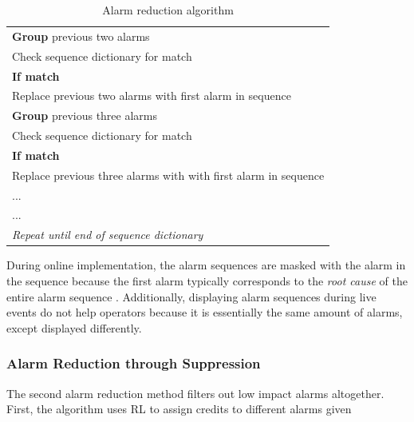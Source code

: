 \begin{table}[H]
{\begin{tabular}{p{14cm}}
	\hspace{1cm} \textbf{Group} previous two alarms \\
	\hspace{1.5cm} Check sequence dictionary for match \\
	\hspace{1.5cm} \textbf{If match} \\
	\hspace{2cm} Replace previous two alarms with first alarm in sequence \\
	\hspace{1cm} \textbf{Group} previous three alarms \\
	\hspace{1.5cm} Check sequence dictionary for match \\
	\hspace{1.5cm} \textbf{If match} \\
	\hspace{2cm} Replace previous three alarms with with first alarm in sequence \\
	\hspace{1.5cm} ... \\
	\hspace{1.5cm} ... \\
	\hspace{1cm} \emph{Repeat until end of sequence dictionary} \\
	\hline
	\end{tabular}}
	\caption{Alarm reduction algorithm}
	\label{alg:03AlarmReduce}
\end{table}

During online implementation, the alarm sequences are masked with the alarm in the sequence because the first alarm typically corresponds to the \textit{root cause} of the entire alarm sequence \cite{alarm_sequence}.  Additionally, displaying alarm sequences during live events do not help operators because it is essentially the same amount of alarms, except displayed differently.

\subsubsection{Alarm Reduction through Suppression}
The second alarm reduction method filters out low impact alarms altogether.  First, the algorithm uses RL to assign credits to different alarms given 


